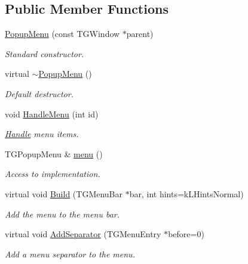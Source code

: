 \subsection*{Public Member Functions}
\begin{DoxyCompactItemize}
\item 
\hyperlink{class_d_d4hep_1_1_popup_menu_afaf85050694a622a0f3f62e2622bc5e9}{PopupMenu} (const TGWindow $\ast$parent)
\begin{DoxyCompactList}\small\item\em Standard constructor. \item\end{DoxyCompactList}\item 
virtual \hyperlink{class_d_d4hep_1_1_popup_menu_aabdf2cc11c5e3cb57049041c459082fd}{$\sim$PopupMenu} ()
\begin{DoxyCompactList}\small\item\em Default destructor. \item\end{DoxyCompactList}\item 
void \hyperlink{class_d_d4hep_1_1_popup_menu_a8f5895d41102d89191fae441522cc53c}{HandleMenu} (int id)
\begin{DoxyCompactList}\small\item\em \hyperlink{class_d_d4hep_1_1_handle}{Handle} menu items. \item\end{DoxyCompactList}\item 
TGPopupMenu \& \hyperlink{class_d_d4hep_1_1_popup_menu_a3142e910b19e33ac04e9e260cb8981be}{menu} ()
\begin{DoxyCompactList}\small\item\em Access to implementation. \item\end{DoxyCompactList}\item 
virtual void \hyperlink{class_d_d4hep_1_1_popup_menu_a896a1626d79fd3d6ccb1c1e0657cf1ae}{Build} (TGMenuBar $\ast$bar, int hints=kLHintsNormal)
\begin{DoxyCompactList}\small\item\em Add the menu to the menu bar. \item\end{DoxyCompactList}\item 
virtual void \hyperlink{class_d_d4hep_1_1_popup_menu_a08a0c971bdb2b8783ea5bff019c64171}{AddSeparator} (TGMenuEntry $\ast$before=0)
\begin{DoxyCompactList}\small\item\em Add a menu separator to the menu. \item\end{DoxyCompactList}\item 

\end{DoxyCompactItemize}
